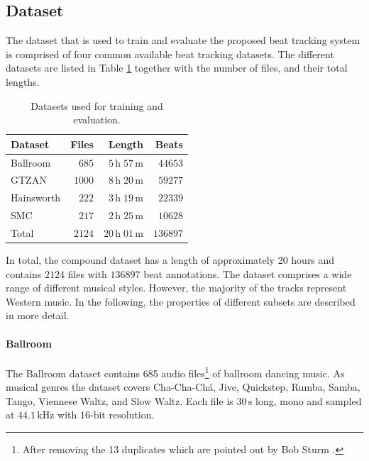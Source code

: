 \documentclass{scrartcl}
\begin{document}
\subsection{Dataset}
The dataset that is used to train and evaluate the proposed beat tracking system is comprised of four common available beat tracking datasets. The different datasets  are listed in Table \ref{tab:datasets} together with the number of files, and their total lengths.
\begin{table}[htbp]
\caption{Datasets used for training and evaluation.}
\label{tab:datasets}
\centering
\begin{tabular}{lrrr}
\hline
\hline
\textbf{Dataset} & \textbf{Files} & \textbf{Length} & \textbf{Beats} \\
\hline
Ballroom \cite{Gouyon2006b, Krebs2013} & $685$ & $5\,\text{h} \;57\,\text{m}$ & $\num{44653}$\\
GTZAN \cite{Tzanetakis2002b, marchand2015swing} & $1000$ & $8\,\text{h}\;20\,\text{m}$ & $\num{59277}$\\
Hainsworth \cite{Hainsworth2004} & $222$ & $3\,\text{h}\;19\,\text{m}$ & $\num{22339}$\\
SMC \cite{Holzapfel2012} & $217$ & $2\,\text{h}\;25\,\text{m}$ & $\num{10628}$\\    
\hline
Total & $2124$ & $ 20\,\text{h}\; 01\,\text{m}$ & $\num{136897}$\\  
\hline
\hline
\end{tabular}
\end{table}  
In total, the compound dataset has a length of approximately 20 hours and contains $\num[group-separator={,}]{2124}$ files with $\num[group-separator={,}]{136897}$ beat annotations. The dataset comprises a wide range of different musical styles. However, the majority of the tracks represent Western music. In the following, the properties of different subsets are described in more detail.   


\paragraph{Ballroom} 
The Ballroom dataset \cite{Gouyon2006b, Krebs2013} contains 685 audio files\footnote{After removing the 13 duplicates which are pointed out by Bob Sturm \cite{Sturm2014}.} of ballroom dancing music. As musical genres the dataset covers Cha-Cha-Chá, Jive, Quickstep, Rumba, Samba, Tango, Viennese Waltz, and Slow Waltz. Each file is $30\,\text{s}$ long, mono and sampled at $44.1\,\text{kHz}$ with $16\text{-bit}$ resolution.
\end{document}
